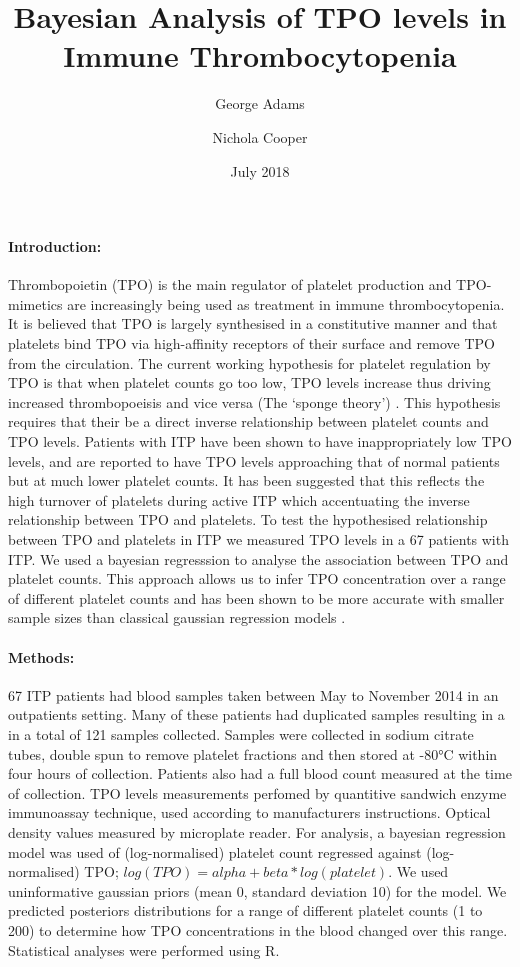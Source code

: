 \documentclass[11pt]{article}
\title{Bayesian Analysis of TPO levels in Immune Thrombocytopenia}
\author[1,2]{\small George Adams}
\author[1,2]{\small Nichola Cooper}
\affil[1]{\footnotesize Imperial College London}
\affil[2]{\footnotesize Imperial College NHS Trust}
\date{July 2018}
\begin{document}
\maketitle

\paragraph{Introduction:} Thrombopoietin (TPO) is the main regulator of platelet production and TPO-mimetics are increasingly being used as treatment in immune thrombocytopenia. It is believed that TPO is largely synthesised in a constitutive manner and that platelets bind TPO via high-affinity receptors of their surface and remove TPO from the circulation. The current working hypothesis for platelet regulation by TPO is that when platelet counts go too low, TPO levels increase thus driving increased thrombopoeisis and vice versa (The `sponge theory') \cite{EtoLinkagemechanismsthrombocytopenia2016}. This hypothesis requires that their be a direct inverse relationship between platelet counts and TPO levels. Patients with ITP have been shown to have inappropriately low TPO levels, and are reported to have TPO levels approaching that of normal patients but at much lower platelet counts. It has been suggested that this reflects the high turnover of platelets during active ITP which accentuating the inverse relationship between TPO and platelets. To test the hypothesised relationship between TPO and platelets in ITP we measured TPO levels in a 67 patients with ITP. We used a bayesian regresssion to analyse the association between TPO and platelet counts. This approach allows us to infer TPO concentration over a range of different platelet counts and has been shown to be more accurate with smaller sample sizes than classical gaussian regression models \cite{GoldsteinBayesiananalysisregression1976}.


\paragraph{Methods:} 67 ITP patients had blood samples taken between May to November 2014 in an outpatients setting. Many of these patients had duplicated samples resulting in a in a total of 121 samples collected. Samples were collected in sodium citrate tubes, double spun to remove platelet fractions and then stored at -80°C within four hours of collection. Patients also had a full blood count measured at the time of collection. TPO levels measurements perfomed by quantitive sandwich enzyme immunoassay technique, used according to manufacturers instructions. Optical density values measured by microplate reader. For analysis, a bayesian regression model was used of (log-normalised) platelet count regressed against (log-normalised) TPO; $log(TPO) = alpha + beta*log(platelet)$. We used uninformative gaussian priors (mean 0, standard deviation 10) for the model. We predicted posteriors distributions for a range of different platelet counts (1 to 200) to determine how TPO concentrations in the blood changed over this range. Statistical analyses were performed using R.
\end{document}
